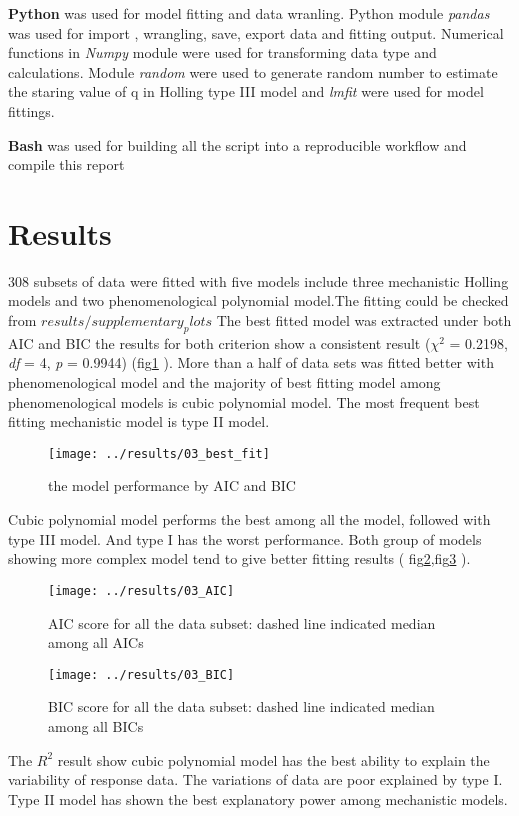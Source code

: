 \documentclass[11pt, a4paper]{article}
\begin{document}
\textbf{Python} was used for model fitting and data wranling. Python module \textit{pandas}\cite{pandas} was used for import , wrangling, save, export data and fitting output. Numerical functions in \textit{Numpy}\cite{Numpy} module were used for transforming data type and calculations. Module \textit{random} were used to generate random number to estimate the staring value of q in Holling type III model and \textit{lmfit}\cite{lmfit} were used for model fittings.

\textbf{Bash} was used for building all the script into a reproducible workflow and compile this report

\section{Results}
308 subsets of data were fitted with five models include three mechanistic Holling models and two phenomenological polynomial model.The fitting could be checked from $ results/supplementary_plots $ The best fitted model was extracted under both AIC and BIC the results for both criterion show a consistent result ($ \chi^{2} $ = 0.2198, \textit{df} = 4, \textit{p} = 0.9944) (fig\ref{fig:03bestfit} ). More than a half of data sets was fitted better with phenomenological model and the majority of best fitting model among phenomenological models is cubic polynomial model. The most frequent best fitting mechanistic model is type II model.

\begin{figure}
	\centering
	\texttt{[image: ../results/03\_best\_fit]}
	\caption{the model performance by AIC and BIC }
	\label{fig:03bestfit}
\end{figure}
\vspace{0.1\baselineskip}
Cubic polynomial model performs the best among all the model, followed with type III model. And type I has the worst performance. Both group of models showing more complex model tend to give better fitting results ( fig\ref{fig:03aic},fig\ref{fig:03bic} ).  
\begin{figure}
	\centering
	\texttt{[image: ../results/03\_AIC]}
	\caption{AIC score for all the data subset: dashed line indicated median among all AICs}
	\label{fig:03aic}
\end{figure}

\begin{figure}
	\centering
	\texttt{[image: ../results/03\_BIC]}
	\caption{BIC score for all the data subset: dashed line indicated median among all BICs}
	\label{fig:03bic}
\end{figure}
\vspace{0.1\baselineskip}
The $ R^{2} $ result show cubic polynomial model has the best ability to explain the variability of response data. The variations of data are poor explained by type I. Type II model has shown the best explanatory power among mechanistic models.
\end{document}
